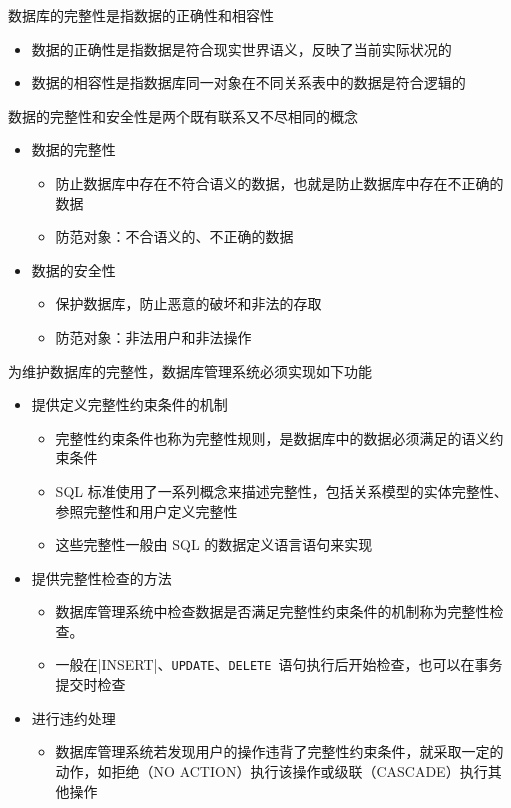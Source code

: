 数据库的完整性是指数据的正确性和相容性
\begin{itemize}
    \item 数据的正确性是指数据是符合现实世界语义，反映了当前实际状况的
    \item 数据的相容性是指数据库同一对象在不同关系表中的数据是符合逻辑的
\end{itemize}

数据的完整性和安全性是两个既有联系又不尽相同的概念
\begin{itemize}
    \item 数据的完整性
    \begin{itemize}
        \item 防止数据库中存在不符合语义的数据，也就是防止数据库中存在不正确的数据
        \item 防范对象：不合语义的、不正确的数据
    \end{itemize}
    \item 数据的安全性
    \begin{itemize}
        \item 保护数据库，防止恶意的破坏和非法的存取
        \item 防范对象：非法用户和非法操作
    \end{itemize}
\end{itemize}

为维护数据库的完整性，数据库管理系统必须实现如下功能
\begin{itemize}
    \item 提供定义完整性约束条件的机制
    \begin{itemize}
        \item 完整性约束条件也称为完整性规则，是数据库中的数据必须满足的语义约束条件
        \item SQL 标准使用了一系列概念来描述完整性，包括关系模型的实体完整性、参照完整性和用户定义完整性
        \item 这些完整性一般由 SQL 的数据定义语言语句来实现 
    \end{itemize}
    \item 提供完整性检查的方法
    \begin{itemize}
        \item 数据库管理系统中检查数据是否满足完整性约束条件的机制称为完整性检查。
        \item 一般在\sverb|INSERT|、\verb|UPDATE|、\verb|DELETE|\ 语句执行后开始检查，也可以在事务提交时检查
    \end{itemize}
    \item 进行违约处理
    \begin{itemize}
        \item 数据库管理系统若发现用户的操作违背了完整性约束条件，就采取一定的动作，如拒绝（NO ACTION）执行该操作或级联（CASCADE）执行其他操作
    \end{itemize}
\end{itemize}
 
